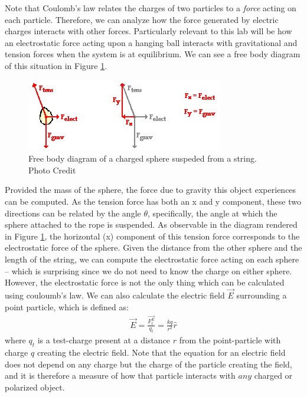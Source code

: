 \documentclass[oneside,12pt]{amsart}
\begin{document}
	\indent Note that Coulomb's law relates the charges of two particles to a \textit{force} acting on each particle. Therefore, we can analyze how the force generated by electric charges interacts with other forces. Particularly relevant to this lab will be how an electrostatic force acting upon a hanging ball interacts with gravitational and tension forces when the system is at equilibrium. We can see a free body diagram of this situation in Figure \ref{frbdy}.\\
	\begin{figure}[h]
		\includegraphics[width=\medgraph,scale=0.01]{frbdy.png}
		\caption{Free body diagram of a charged sphere suspeded from a string. Photo Credit \cite{physcls} 
		}
		\label{frbdy}
	\end{figure}

	\indent Provided the mass of the sphere, the force due to gravity this object experiences can be computed. As the tension force has both an x and y component, these two directions can be related by the angle $\theta$, specifically, the angle at which the sphere attached to the rope is suspended. As observable in the diagram rendered in Figure \ref{frbdy}, the horizontal (x) component of this tension force corresponds to the electrostatic force of the sphere. Given the distance from the other sphere and the length of the string, we can compute the electrostatic force acting on each sphere -- which is surprising since we do not need to know the charge on either sphere.\\
	
	\indent However, the electrostatic force is not the only thing which can be calculated using couloumb's law. We can also calculate the electric field $\vec{E}$ surrounding a point particle, which is defined as\cite{electricfield}:
	\begin{align}
	\vec{E} = \frac{\vec{F^E_t}}{q_t} = \frac{kq}{r^2}\hat{r}
	\end{align} 
	where $q_t$ is a test-charge present at a distance $r$ from the point-particle with charge $q$ creating the electric field. Note that the equation for an electric field does not depend on any charge but the charge of the particle creating the field, and it is therefore a measure of how that particle interacts with $any$ charged or polarized object.
	
\end{document}
